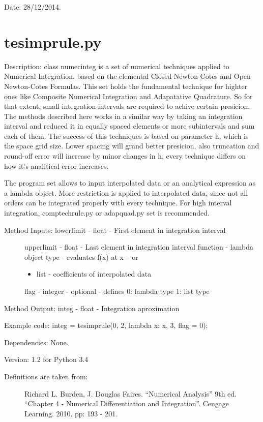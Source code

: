 \documentclass[letterpaper,10pt,oneside]{sphinxmanual}
\theoremstyle{plain}%
\theoremstyle{definition}%
\theoremstyle{remark}%
\begin{document}
Date: 28/12/2014.


\section{tesimprule.py}
\label{code:module-tesimprule}\label{code:tesimprule-py}
Description: class numecinteg is a set of numerical techniques applied to
Numerical Integration, based on the elemental Closed Newton-Cotes and
Open Newton-Cotes Formulas. This set holds the fundamental technique for
highter ones like Composite Numerical Integration and Adapatative Quadrature.
So for that extent, small integration intervals are required to achive certain
presicion. The methods described here works in a similar way by taking an
integration interval and reduced it in equally spaced elements or more 
subintervals and sum each of them. The success of this techniques is based
on parameter h, which is the space grid size. Lower spacing will grand better
presicion, also truncation and round-off error will increase by minor changes
in h, every technique differs on how it's analitical error increases.

The program set allows to input interpolated data or an analytical expression
as a lambda object. More restriction is applied to interpolated data, since
not all orders can be integrated properly with every technique. For high 
interval integration, comptechrule.py or adapquad.py set is recommended.
\begin{description}
\item[{Method Inputs: lowerlimit - float - First element in integration interval}] \leavevmode
upperlimit - float - Last element in integration interval
function - lambda object type - evaluates f(x) at x -- or
\begin{itemize}
\item {} 
list - coefficients of interpolated data

\end{itemize}

flag - integer - optional - defines 0: lambda type 1: list type

\end{description}

Method Output: integ - float - Integration aproximation

Example code: integ = tesimprule(0, 2, lambda x: x, 3, flag = 0);

Dependencies: None.

Version: 1.2 for Python 3.4
\begin{description}
\item[{Definitions are taken from:}] \leavevmode
Richard L. Burden, J. Douglas Faires. ``Numerical Analysis'' 9th ed.
``Chapter 4 - Numerical Differentiation and Integration''. 
Cengage Learning. 2010. pp: 193 - 201.

\end{description}
\end{document}
